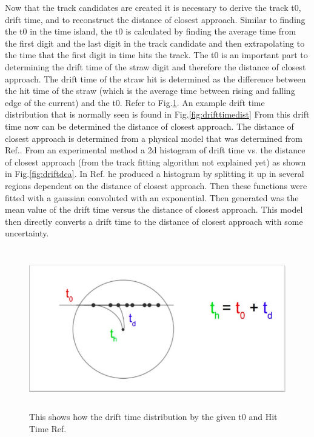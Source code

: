\documentclass[./Thesis]{subfiles}
\begin{document}
	
	Now that the track candidates are created it is necessary to derive the track t0, drift time, and to reconstruct the distance of closest approach.  Similar to finding the t0 in the time island, the t0 is calculated by finding the average time from the first digit and the last digit in the track candidate and then extrapolating to the time that the first digit in time hits the track. The t0 is an important part to determining the drift time of the straw digit and therefore the distance of closest approach.  The drift time of the straw hit is determined as the difference between the hit time of the straw (which is the average time between rising and falling edge of the current) and the t0.  Refer to Fig.\ref{fig:drifttime}.  An example drift time distribution that is normally seen is found in Fig.\ref{fig:drifttimedist} From this drift time now can be determined the distance of closest approach.  The distance of closest approach is determined from a physical model that was determined from Ref.\cite{jMottdca}.  From an experimental method a 2d histogram of drift time vs. the distance of closest approach (from the track fitting algorithm not explained yet) as shown in Fig.\ref{fig:driftdca}.  In Ref.\cite{jMottdca} he produced a histogram by splitting it up in several regions dependent on the distance of closest approach.  Then these functions were fitted with a gaussian convoluted with an exponential.  Then generated was the mean value of the drift time versus the distance of closest approach.  This model then directly converts a drift time to the distance of closest approach with some uncertainty.	
	
\begin{figure}
	\centerline{\includegraphics[height=70mm]{drifttime.jpeg}}
	\caption[Drift Time Determination]{ This shows how the drift time distribution by the given t0 and Hit Time  Ref.\cite{trackerWiki}
	}
	\label{fig:drifttime}
\end{figure} 
	
\end{document}
